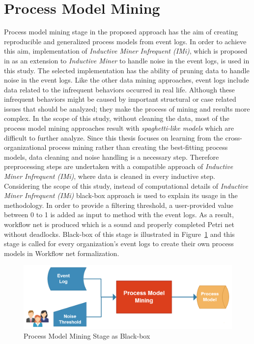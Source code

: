 \section{Process Model Mining}
\label{sec:process-model-mining}
Process model mining stage in the proposed approach has the aim of creating reproducible and generalized process models from event logs. In order to achieve this aim, implementation of \textit{Inductive Miner Infrequent (IMi)}, which is proposed in \cite{leemans2014discoveringinfrequent} as an extension to \textit{Inductive Miner} to handle noise in the event logs, is used in this study. 
The selected implementation has the ability of pruning data to handle noise in the event logs. Like the other data mining approaches, event logs include data related to the infrequent behaviors occurred in real life. Although these infrequent behaviors might be caused by important structural or case related issues that should be analyzed; they make the process of mining and results more complex. In the scope of this study, without cleaning the data, most of the process model mining approaches result with \textit{spaghetti-like models}\cite{van2011process} which are difficult to further analyze. Since this thesis focuses on learning from the cross-organizational process mining rather than creating the best-fitting process models, data cleaning and noise handling is a necessary step. Therefore preprocessing steps are undertaken with a compatible approach of \textit{Inductive Miner Infrequent (IMi)}, where data is cleaned in every inductive step.
Considering the scope of this study, instead of computational details of \textit{Inductive Miner Infrequent (IMi)} black-box approach is used to explain its usage in the methodology. In order to provide a filtering threshold, a user-provided value between 0 to 1 is added as input to method with the event logs. As a result, workflow net is produced which is a sound and properly completed Petri net without deadlocks. Black-box of this stage is illustrated in Figure~\ref{fig:process-model-mining-blackbox} and this stage is called for every organization's event logs to create their own process models in Workflow net formalization.

\begin{figure}
  \centering
  \includegraphics[width=\textwidth]{4_methodology/process-model-mining-blackbox}
  \caption{Process Model Mining Stage as Black-box }
  \label{fig:process-model-mining-blackbox}
\end{figure}


